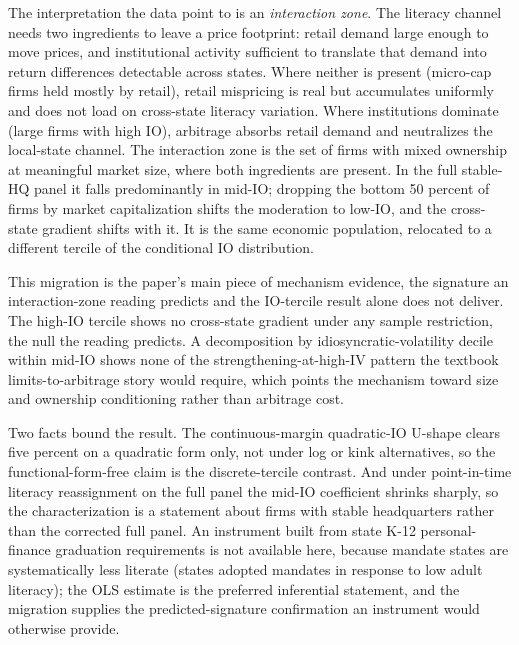 The interpretation the data point to is an \emph{interaction zone}. The literacy channel needs two ingredients to leave a price footprint: retail demand large enough to move prices, and institutional activity sufficient to translate that demand into return differences detectable across states. Where neither is present (micro-cap firms held mostly by retail), retail mispricing is real but accumulates uniformly and does not load on cross-state literacy variation. Where institutions dominate (large firms with high IO), arbitrage absorbs retail demand and neutralizes the local-state channel. The interaction zone is the set of firms with mixed ownership at meaningful market size, where both ingredients are present. In the full stable-HQ panel it falls predominantly in mid-IO; dropping the bottom 50 percent of firms by market capitalization shifts the moderation to low-IO, and the cross-state gradient shifts with it. It is the same economic population, relocated to a different tercile of the conditional IO distribution.

This migration is the paper's main piece of mechanism evidence, the signature an interaction-zone reading predicts and the IO-tercile result alone does not deliver. The high-IO tercile shows no cross-state gradient under any sample restriction, the null the reading predicts. A decomposition by idiosyncratic-volatility decile within mid-IO shows none of the strengthening-at-high-IV pattern the textbook limits-to-arbitrage story would require, which points the mechanism toward size and ownership conditioning rather than arbitrage cost.

Two facts bound the result. The continuous-margin quadratic-IO U-shape clears five percent on a quadratic form only, not under log or kink alternatives, so the functional-form-free claim is the discrete-tercile contrast. And under point-in-time literacy reassignment on the full panel the mid-IO coefficient shrinks sharply, so the characterization is a statement about firms with stable headquarters rather than the corrected full panel. An instrument built from state K-12 personal-finance graduation requirements is not available here, because mandate states are systematically less literate (states adopted mandates in response to low adult literacy); the OLS estimate is the preferred inferential statement, and the migration supplies the predicted-signature confirmation an instrument would otherwise provide.


